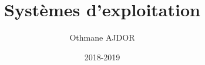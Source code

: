 \documentclass[11pt]{article}
\title{Systèmes d'exploitation}
\author{Othmane AJDOR}
\date{2018-2019}
\begin{document}
\maketitle

\pagebreak
\tableofcontents
\pagebreak
\end{document}
